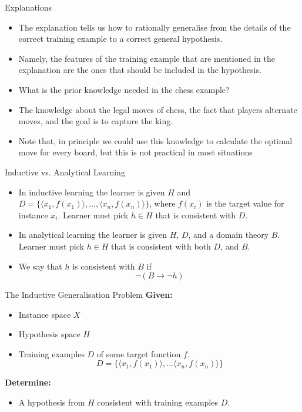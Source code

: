 \documentclass[%
pdf,
colorBG,
slideColor,
tcrico,
]{prosper}
\begin{document}
\begin{slide}{Explanations}
\tiny
	\begin{itemize}
	\item The explanation tells us how to rationally  generalise from the details of the correct training example to a correct general hypothesis.
	\item  Namely, the features of the training example that are mentioned in the explanation are the ones that should be included in the hypothesis.
\item What is the prior knowledge needed in the chess example?
\item The knowledge about the legal moves of chess, the fact that players alternate moves, and the goal is to capture the king.
\item Note that, in principle we could use this knowledge to calculate the optimal move for every board, but this is not practical in most situations
	\end{itemize}
\end{slide}




\begin{slide}{Inductive vs. Analytical Learning}
	\begin{itemize}
	\item In inductive learning the learner is given $H$ and $D= \{\langle x_1, f(x_1) \rangle,\ldots,\langle x_n, f(x_n)\rangle\}$, where $f(x_i)$ is the target value for instance $x_i$. Learner must pick $h \in H$ that is consistent with $D$.
    	\item In analytical learning the learner is given $H$, $D$, and a domain theory $B$. Learner must pick $h \in H$ that is consistent with both $D$, and $B$.
    	\item We say that $h$ is consistent with $B$ if \[ \neg (B \rightarrow \neg h) \]
	\end{itemize}
\end{slide}



\begin{slide}{The Inductive Generalisation Problem}
\tiny
	{\bf Given:}
	\begin{itemize}
	\item Instance space $X$
	\item Hypothesis space $H$
	\item Training examples $D$ of some target function $f$. 
	\[ D = \{
	\langle x_{1}, f(x_{1}) \rangle, \dots \langle x_{n}, f(x_{n}) \rangle
	\} \]
	\end{itemize}
	
	{\bf Determine:}
	\begin{itemize}
	\item A hypothesis from $H$ consistent with training examples $D$.
	\end{itemize}
\end{slide}
\end{document}
